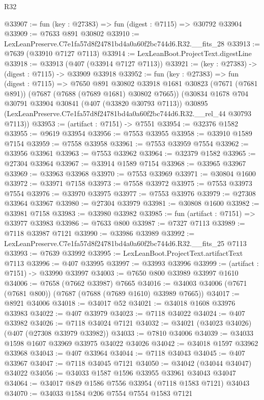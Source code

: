 \begin{lexlean}{R32}
\begin{coremodule}
@33907 := fun (key : @27383) => fun (digest : @7115) => @30792 @33904
@33909 := @7633 @891 @30802
@33910 := LexLeanPreserve.C7e1fa57d8f24781bd4a0a60f2bc744d6.R32.__fits_28
@33913 := @7639 (@33910 @7127 @7113)
@33914 := LexLeanBoot.ProjectText.digestLine
@33918 := @33913 (@407 (@33914 @7127 @7113))
@33921 := (key : @27383) -> (digest : @7115) -> @33909 @33918
@33952 := fun (key : @27383) =>
  fun (digest : @7115) =>
  @7650
    @891
    @30802
    @33918
    @1681
    @30823
    (@7671 (@7681 @891))
    (@7687 (@7688 (@7689 @1681) @30802 @7665))
    (@30834
      @1678
      @704
      @30791
      @33904
      @30841
      (@407 (@33820 @30793 @7113))
      @30895
      (LexLeanPreserve.C7e1fa57d8f24781bd4a0a60f2bc744d6.R32.__rel_44 @30793 @7113))
@33953 := (artifact : @7151) -> @7551
@33954 := @32376 @1582
@33955 := @9619 @33954
@33956 := @7553 @33955
@33958 := @33910 @1589 @7154
@33959 := @7558 @33958
@33961 := @7553 @33959 @7554
@33962 := @33956 @33961
@33963 := @7553 @33962
@33964 := @32379 @1582
@33965 := @27304 @33964
@33967 := @33914 @1589 @7154
@33968 := @33965 @33967
@33969 := @33963 @33968
@33970 := @7553 @33969
@33971 := @30804 @1600
@33972 := @33971 @7158
@33973 := @7558 @33972
@33975 := @7553 @33973 @7554
@33976 := @33970 @33975
@33977 := @7553 @33976
@33979 := @27308 @33964 @33967
@33980 := @27304 @33979
@33981 := @30808 @1600
@33982 := @33981 @7158
@33983 := @33980 @33982
@33985 := fun (artifact : @7151) => @33977 @33983
@33986 := @7633 @800
@33987 := @7327 @7113
@33989 := @7118 @33987 @7121
@33990 := @33986 @33989
@33992 := LexLeanPreserve.C7e1fa57d8f24781bd4a0a60f2bc744d6.R32.__fits_25 @7113
@33993 := @7639 @33992
@33995 := LexLeanBoot.ProjectText.artifactText @7113
@33996 := @407 @33995
@33997 := @33993 @33996
@33999 := (artifact : @7151) -> @33990 @33997
@34003 := @7650 @800 @33989 @33997 @1610
@34006 := @7658 (@7662 @33987) @7665
@34016 := @34003 @34006 (@7671 (@7681 @800)) (@7687 (@7688 (@7689 @1610) @33989 @7665))
@34017 := @8921 @34006
@34018 := @34017 @52
@34021 := @34018 @1608 @33976 @33983
@34022 := @407 @33979
@34023 := @7118 @34022
@34024 := @407 @33982
@34026 := @7118 @34024 @7121
@34032 := @34021 (@34023 @34026) (@407 (@27308 @33979 @33982))
@34033 := @7810 @34006
@34039 := @34033 @1598 @1607 @33969 @33975 @34022 @34026
@34042 := @34018 @1597 @33962 @33968
@34043 := @407 @33964
@34044 := @7118 @34043
@34045 := @407 @33967
@34047 := @7118 @34045 @7121
@34050 := @34042 (@34044 @34047) @34022
@34056 := @34033 @1587 @1596 @33955 @33961 @34043 @34047
@34064 := @34017 @849 @1586 @7556 @33954 (@7118 @1583 @7121) @34043
@34070 := @34033 @1584 @206 @7554 @7554 @1583 @7121

\end{coremodule}
\end{lexlean}
